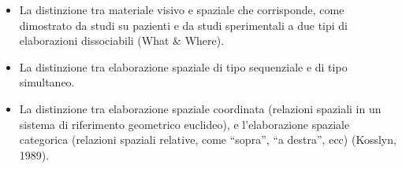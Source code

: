 \begin{itemize}
  \item La distinzione tra materiale visivo e spaziale che corrisponde, come dimostrato da studi su pazienti e da studi sperimentali a due tipi di elaborazioni dissociabili (What \& Where).
  \item La distinzione tra elaborazione spaziale di tipo sequenziale e di tipo simultaneo.
  \item La distinzione tra elaborazione spaziale coordinata (relazioni spaziali in un sistema di riferimento geometrico euclideo), e l'elaborazione spaziale categorica (relazioni spaziali relative, come ``sopra'', ``a destra'', ecc) (Kosslyn, 1989).
\end{itemize}